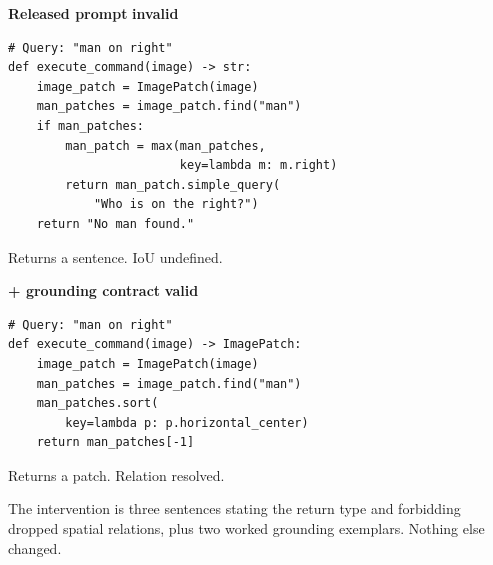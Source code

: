 \documentclass[11pt,a4paper]{article}
\newcommand{\up}[1]{\textcolor{good}{\textbf{#1}}}
\newcommand{\down}[1]{\textcolor{bad}{\textbf{#1}}}
\begin{document}
\begin{minipage}[t]{0.48\textwidth}
\textbf{Released prompt} \quad\down{invalid}
\begin{lstlisting}
# Query: "man on right"
def execute_command(image) -> str:
    image_patch = ImagePatch(image)
    man_patches = image_patch.find("man")
    if man_patches:
        man_patch = max(man_patches,
                        key=lambda m: m.right)
        return man_patch.simple_query(
            "Who is on the right?")
    return "No man found."
\end{lstlisting}
Returns a sentence. IoU undefined.
\end{minipage}\hfill
\begin{minipage}[t]{0.48\textwidth}
\textbf{+ grounding contract} \quad\up{valid}
\begin{lstlisting}
# Query: "man on right"
def execute_command(image) -> ImagePatch:
    image_patch = ImagePatch(image)
    man_patches = image_patch.find("man")
    man_patches.sort(
        key=lambda p: p.horizontal_center)
    return man_patches[-1]
\end{lstlisting}
Returns a patch. Relation resolved.
\end{minipage}

\vspace{5pt}
The intervention is three sentences stating the return type and forbidding dropped
spatial relations, plus two worked grounding exemplars. Nothing else changed.
\end{document}
